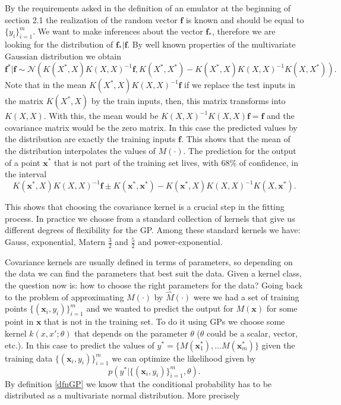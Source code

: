 \documentclass[12pt]{book}
\newcommand{\x}{\textbf{x}}
\begin{document}
By the requirements asked in the definition of an emulator at the beginning of section 2.1
 the realization of the random vector $\textbf{f}$ is known and should be equal to $\{y_{i}\}_{i=1}^{m}$.  
We want to make inferences about the vector $\textbf{f}_{*}$,
therefore we are looking for the distribution of $\textbf{f}_{*}|\textbf{f}$. By well known properties
of the multivariate Gaussian distribution we  obtain  \cite{lifshits2013gaussian}
\begin{equation}\label{eqnformulameancovariance}
\textbf{f}^{*}|\textbf{f}\sim\mathscr{N}\left(K(X^{*},X)K(X,X)^{-1}\textbf{f},
K(X^{*},X^{*})-K(X^{*},X)K(X,X)^{-1}K(X,X^{*})\right).
\end{equation}
Note that in the mean $K(X^{*},X)K(X,X)^{-1}\textbf{f}$ if we replace the test inputs in the matrix
$K(X^{*},X)$ by the train inputs, then, this matrix transforms into $K(X,X)$. With this, the mean
would be $K(X,X)^{-1}K(X,X)\textbf{f}=\textbf{f}$ and the covariance matrix would be the zero matrix. 
In this case the predicted values by the distribution are exactly the training inputs $\textbf{f}$.
This shows that the mean of the distribution interpolates the values  of $M(\cdot)$. The prediction for
the output of 
a point $\textbf{x}^{*}$ that is not part of the training set lives, with $68\%$ of confidence, in the interval
\begin{equation*}
K(\textbf{x}^{*},X)K(X,X)^{-1}\textbf{f}\pm K(\textbf{x}^{*},\textbf{x}^{*})-
K(\textbf{x}^{*},X)K(X,X)^{-1}K(X,\textbf{x}^{*}).
\end{equation*}

This shows that choosing the covariance kernel 
is a crucial step in the fitting process. In practice we choose from a standard collection of kernels
that give us different degrees of flexibility for the GP. Among these standard kernels we have: Gauss,
exponential, Matern $\frac{3}{2}$ and $\frac{5}{2}$ and power-exponential.

Covariance kernels are usually defined in terms of parameters, so depending on the data 
we can find the parameters that best suit the data. Given a kernel class, the question now is: how
to choose the right parameters for the data? Going back to the problem of approximating $M(\cdot)$
by $\hat{M}(\cdot)$ were  we had a 
set of training points $\{(\x_{i},y_{i})\}_{i=1}^{m}$ and we wanted to predict the 
output for  $M(\textbf{x})$ for some point in $\x$ that is not in the training set. 
To do it 
using GPs we choose some kernel  $k(x,x';\theta)$ that depends on the parameter $\theta$ 
($\theta$ could be a scalar, vector, etc.). In this case to predict the values of 
$y^{*}=\{M(\x_{1}^{*}),\ldots M(\x_{m}^{*})\}$ given the training data $\{(\x_{i},y_{i})\}_{i=1}^{m}$
we can optimize the likelihood given by
\begin{equation*}
p(y^{*}|\{(\x_{i},y_{i})\}_{i=1}^{m},\theta).
\end{equation*}
By definition \ref{dfnGP} we know that the conditional probability has to be distributed as
a multivariate normal distribution. More precisely
\end{document}
